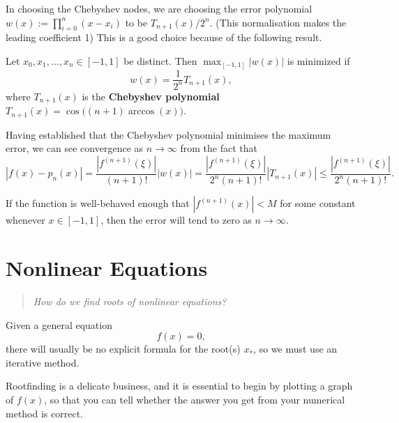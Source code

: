 \documentclass[
  letterpaper,
  DIV=11,
  numbers=noendperiod]{scrreprt}
\newenvironment{fbxSimple}[3]{\begin{tcolorbox}[enhanced, breakable,%
attach boxed title to top*={xshift=1.4pt},
boxed title style={boxrule=0.0mm, fuzzy shadow={1pt}{-1pt}{0mm}{0.1mm}{gray}, arc=.3em, rounded corners=east, sharp corners=west}, colframe=#1-color2, colbacktitle=#1-color1, colback = white, coltitle=black,  titlerule=0mm, toprule=0pt, bottomrule=.7pt, leftrule=.3em, rightrule=.7pt, outer arc=.3em,  	left=.5em, right=.5em, bottomtitle=1mm, toptitle=1mm,title=\textbf{#2}\hspace{0.5em}{#3}]}
{\end{tcolorbox}}
\begin{document}
In choosing the Chebyshev nodes, we are choosing the error polynomial
\(w(x):=\prod_{i=0}^n(x-x_i)\) to be \(T_{n+1}(x)/2^n\). (This
normalisation makes the leading coefficient 1) This is a good choice
because of the following result.

\label{chebyshev-interpolation}
\begin{fbxSimple}{theorem}{Theorem 2.7: }{Chebyshev interpolation}
\label{chebyshev-interpolation}
Let \(x_0, x_1, \ldots, x_n \in [-1,1]\) be distinct. Then
\(\max_{[-1,1]}|w(x)|\) is minimized if \[
w(x) = \frac{1}{2^n}T_{n+1}(x),
\] where \(T_{n+1}(x)\) is the \textbf{Chebyshev polynomial}
\(T_{n+1}(x) = \cos\Big((n+1)\arccos(x)\Big)\).

\end{fbxSimple}

Having established that the Chebyshev polynomial minimises the maximum
error, we can see convergence as \(n\to\infty\) from the fact that \[
|f(x) - p_n(x)| = \frac{|f^{(n+1)}(\xi)|}{(n+1)!}|w(x)| = \frac{|f^{(n+1)}(\xi)|}{2^n(n+1)!}|T_{n+1}(x)| \leq \frac{|f^{(n+1)}(\xi)|}{2^n(n+1)!}.
\]

If the function is well-behaved enough that \(|f^{(n+1)}(x)| < M\) for
some constant whenever \(x \in [-1,1]\), then the error will tend to
zero as \(n \to \infty\).

\section{Nonlinear Equations}\label{nonlinear-equations}

\begin{quote}
\emph{How do we find roots of nonlinear equations?}
\end{quote}

Given a general equation \[
f(x) = 0,
\] there will usually be no explicit formula for the root(s) \(x_*\), so
we must use an iterative method.

Rootfinding is a delicate business, and it is essential to begin by
plotting a graph of \(f(x)\), so that you can tell whether the answer
you get from your numerical method is correct.
\end{document}
